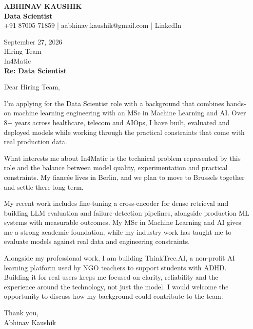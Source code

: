 \documentclass[10pt,a4paper]{article}
\begin{document}
\begin{center}
{\Large\bfseries ABHINAV KAUSHIK}\\[2pt]
{\bfseries Data Scientist}\\[2pt]
+91 87005 71859 \quad | \quad aabhinav.kaushik@gmail.com \quad | \quad LinkedIn
\end{center}
\vspace{8pt}
September 27, 2026\\[6pt]
Hiring Team\\
In4Matic\\[4pt]
\textbf{Re: Data Scientist}

Dear Hiring Team,

I’m applying for the Data Scientist role with a background that combines hands-on machine learning engineering with an MSc in Machine Learning and AI. Over 8+ years across healthcare, telecom and AIOps, I have built, evaluated and deployed models while working through the practical constraints that come with real production data.

What interests me about In4Matic is the technical problem represented by this role and the balance between model quality, experimentation and practical constraints. My fiancée lives in Berlin, and we plan to move to Brussels together and settle there long term.

My recent work includes fine-tuning a cross-encoder for dense retrieval and building LLM evaluation and failure-detection pipelines, alongside production ML systems with measurable outcomes. My MSc in Machine Learning and AI gives me a strong academic foundation, while my industry work has taught me to evaluate models against real data and engineering constraints.

Alongside my professional work, I am building ThinkTree.AI, a non-profit AI learning platform used by NGO teachers to support students with ADHD. Building it for real users keeps me focused on clarity, reliability and the experience around the technology, not just the model. I would welcome the opportunity to discuss how my background could contribute to the team.

Thank you,\\
Abhinav Kaushik
\end{document}
